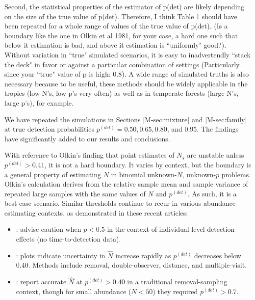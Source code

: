 \documentclass[12pt]{article}
\renewenvironment{quote}  %
              {\list{}{\rightmargin\leftmargin}\normalfont%
               \item\relax}
              {\endlist}
\newcommand{\pdet}{p^{(det)}}
\begin{document}
Second, the statistical properties of the estimator of p(det) are likely depending on the size of the true value of p(det). Therefore, I think Table 1 should have been repeated for a whole range of values of the true value of p(det).
(Is a boundary like the one in Olkin et al 1981, for your case, a hard one such that below it estimation is bad, and above it estimation is ``uniformly" good?).
Without variation in ``true" simulated scenarios, it is easy to inadvertendly ``stack the deck" in favor or against a particular combination of settings (Particularly since your ``true" value of p is high: 0.8). A wide range of simulated truths is also necessary because to be useful, these methods should be widely applicable in the
tropics (low N's, low p's very often) as well as in temperate forests (large N's, large p's), for example.
\begin{quote}
We have repeated the simulations in Sections \ref{M-sec:mixture} and \ref{M-sec:family} at true detection probabilities $\pdet = 0.50, 0.65, 0.80$, and 0.95.
The findings have significantly added to our results and conclusions.

With reference to Olkin's finding that point estimates of $N_s$ are unstable unless $\pdet>0.41$, it is not a hard boundary.  
It varies by context, but the boundary is a general property of estimating $N$ in binomial unknown-$N$, unknown-$p$ problems.
Olkin's calculation derives from the relative sample mean and sample variance of repeated large samples with the same values of $N$ and $\pdet$.
As such, it is a best-case scenario.
Similar thresholds continue to recur in various abundance-estimating contexts, as demonstrated in these recent articles: 
\begin{itemize}
\item \citet{Veech2016}: advise caution when $p<0.5$ in the context of individual-level detection effects (no time-to-detection data). 
\item \citet{Field2016}: plots indicate uncertainty in $\hat{N}$ increase rapidly as $\pdet$ decreases below 0.40.  Methods include removal, double-observer, distance, and multiple-visit.
\item \citet{Davis2016}: report accurate $\hat{N}$ at $\pdet >0.40$ in a traditional removal-sampling context, though for small abundance ($N<50$) they required $\pdet > 0.7$.
\end{itemize}
\end{quote}
\end{document}
